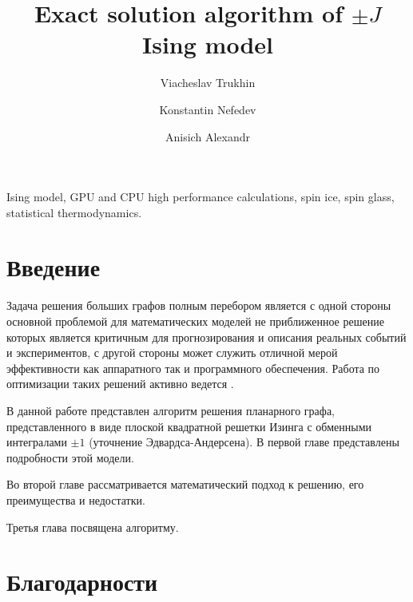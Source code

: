 \documentclass[utf8, babel, sor, jor, amsmath, amssymb, reprint]{elsarticle} %
\begin{document}
	
	\begin{frontmatter}
		
		
		\title{Exact solution algorithm of $\pm J$ Ising model}
		
		\author[mainaddress, secondaryaddress]{Viacheslav Trukhin}
		
		\author[mainaddress, secondaryaddress]{Konstantin Nefedev}
		\author[mainaddress, secondaryaddress]{Anisich Alexandr}
		
		\address[mainaddress]{Far Eastern Federal University, Vladivostok, Russky Island, 10 Ajax Bay, 690922, the Russian Federation}
		\address[secondaryaddress]{Institute of Applied Mathematics, Far Eastern Branch, Russian Academy of Science, Vladivostok, Radio 7, 690041, the Russian Federation}
		
		\begin{abstract}
			
			
		\end{abstract}
		
		
		\begin{keyword}
			Ising model, GPU and CPU high performance calculations, spin ice, spin glass, statistical thermodynamics.
			
		\end{keyword}
		
		
	\end{frontmatter}
	
	\linenumbers
	\newpage
	\tableofcontents
	
	\newpage
	\section{Введение}

	Задача решения больших графов полным перебором является с одной стороны основной проблемой для математических моделей не приближенное решение которых является критичным для прогнозирования и описания реальных событий и экспериментов, с другой стороны может служить отличной мерой эффективности как аппаратного так и программного обеспечения. Работа по оптимизации таких решений активно ведется \cite{romero2020high}. 
	
	В данной работе представлен алгоритм решения планарного графа, представленного в виде плоской квадратной решетки Изинга с обменными интегралами $\pm 1$ (уточнение Эдвардса-Андерсена). В первой главе представлены подробности этой модели.
	
	Во второй главе рассматривается математический подход к решению, его преимущества и недостатки.
	
	Третья глава посвящена алгоритму.
	
	
	\section{Благодарности}
	
	
	
	
	
	
\end{document}
